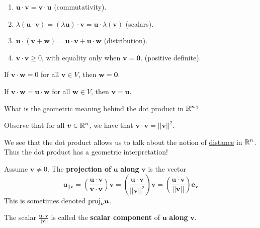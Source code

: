 \begin{theorem}
    
    \begin{enumerate}
        \item $\bm{u} \cdot \bm{v} = \bm{v} \cdot \bm{u}$ (commutativity).
        \item $\lambda(\bm{u} \cdot \bm{v}) = (\lambda\bm{u}) \cdot \bm{v} = \bm{u} \cdot \lambda(\bm{v})$ (scalars).
        \item $\bm{u} \cdot (\bm{v} + \bm{w}) = \bm{u} \cdot \bm{v} + \bm{u} \cdot \bm{w}$ (distribution).
        \item $\bm{v} \cdot \bm{v} \geq 0$, with equality only when $\bm{v} = \bm{0}$. (positive definite).  
    \end{enumerate}
    
    \end{theorem}




    \begin{proposition}\label{dotproduniqueness}
    If $\bm{v} \cdot \bm{w} = 0$ for all $\bm{v} \in V$, then $\bm{w} = \bm{0}$.
    \end{proposition}
    
    
    \begin{corollary}
    If $ \bm{v} \cdot \bm{w} = \bm{u} \cdot \bm{w}$ for all $\bm{w} \in V$, then $\bm{v} = \bm{u}$.
    \end{corollary}

\begin{motivating}
What is the geometric meaning behind the dot product in $\mathbb{R}^n$?
\end{motivating}


\begin{proposition}
    Observe that for all $\bm{v} \in \mathbb{R}^n$, we have that $\bm{v} \cdot \bm{v} = ||\bm{v}||^2$. 
\end{proposition}
    
    We see that the dot product allows us to talk about the notion of \underline{distance} in $\mathbb{R}^n$.  Thus the dot product has a geometric interpretation!
    
    \begin{definition}
    Assume $\bm{v} \neq 0$.  The \textbf{projection of} $\bm{u}$ \textbf{along} $\bm{v}$ is the vector
    $$\bm{u_{||v}} = \left(\frac{\bm{u} \cdot \bm{v}}{\bm{v} \cdot \bm{v}}\right)\bm{v} 
    = \left(\frac{\bm{u} \cdot \bm{v}}{||\bm{v}||^2}\right)\bm{v} = \left(\frac{\bm{u} \cdot \bm{v}}{||\bm{v}||}\right)\bm{e_v}$$
    This is sometimes denoted $\textnormal{proj}_{\bm{v}}\bm{u}$.  
    
    \vspace{1em}
    
    The scalar $\frac{\bm{u} \cdot \bm{v}}{||\bm{v}||}$ is called the \textbf{scalar component} of $\bm{u}$ \textbf{along} $\bm{v}$.
    \end{definition}
    
